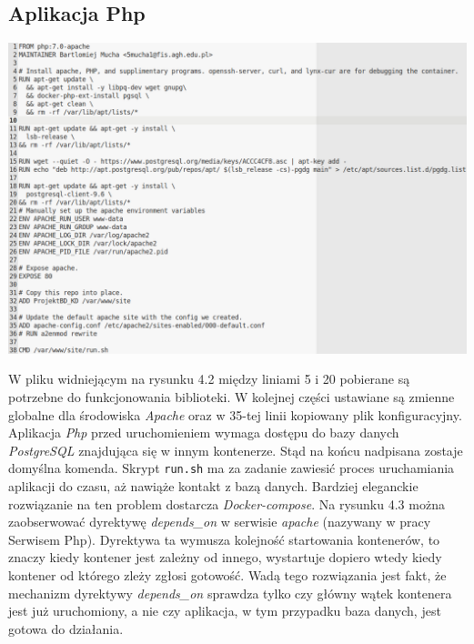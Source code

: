 \documentclass[polish, a4paper, 12pt, oneside]{book}
\begin{document}
	\subsection{Aplikacja Php}
	\begin{center}
		\includegraphics[width=160mm]{dockerfile_php.png}
	\end{center}
	W pliku widniejącym na rysunku 4.2 między liniami 5 i 20 pobierane są potrzebne do funkcjonowania biblioteki. W kolejnej części ustawiane są zmienne globalne dla środowiska \textit{Apache}\cite{apache} oraz w 35-tej linii kopiowany plik konfiguracyjny. Aplikacja \textit{Php} przed uruchomieniem wymaga dostępu do bazy danych \textit{PostgreSQL}\cite{postgresql} znajdująca się w innym kontenerze. Stąd na końcu nadpisana zostaje domyślna komenda. Skrypt \texttt{run.sh} ma za zadanie zawiesić proces uruchamiania aplikacji do czasu, aż nawiąże kontakt z bazą danych. Bardziej eleganckie rozwiązanie na ten problem dostarcza \textit{Docker-compose}\cite{dockercompose}. Na rysunku 4.3 można zaobserwować dyrektywę \textit{depends\_on} w serwisie \textit{apache} (nazywany w pracy Serwisem Php). Dyrektywa ta wymusza kolejność startowania kontenerów, to znaczy kiedy kontener jest zależny od innego, wystartuje dopiero wtedy kiedy kontener od którego zleży zgłosi gotowość. Wadą tego rozwiązania jest fakt, że mechanizm dyrektywy \textit{depends\_on} sprawdza tylko czy główny wątek kontenera jest już uruchomiony, a nie czy aplikacja, w tym przypadku baza danych, jest gotowa do działania.
	
\end{document}
